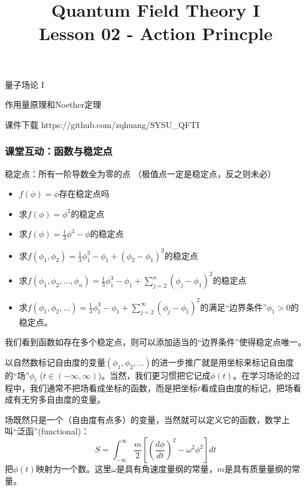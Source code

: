 \documentclass[CJK]{beamer}
\title{Quantum Field Theory I \\ Lesson 02 - Action Princple}
\author{}
\date{}
\begin{document}
\begin{frame}
 
\begin{center}
\begin{Large}
\bch
量子场论 I 

{\vskip 0.3in}

作用量原理和Noether定理

\ech
\end{Large}
\end{center}

\vskip 0.2in

\bch
课件下载
\ech
https://github.com/zqhuang/SYSU\_QFTI

\end{frame}


\begin{frame}
\frametitle{\bch 课堂互动：函数与稳定点 \ech}
\bch
稳定点：所有一阶导数全为零的点 （极值点一定是稳定点，反之则未必）
\begin{itemize}
\item{$f(\phi) = \phi$存在稳定点吗}
\item{求$f(\phi) = \phi^2$的稳定点}
\item{求$f(\phi) = \frac{1}{3}\phi^3-\phi$的稳定点}
\item{求$f(\phi_1, \phi_2) = \frac{1}{3}\phi_1^3 - \phi_1 + (\phi_2-\phi_1)^2$的稳定点}
\item{求$f(\phi_1, \phi_2, \ldots, \phi_n) = \frac{1}{3}\phi_1^3 - \phi_1 + \sum_{j=2}^n(\phi_j - \phi_1)^2$的稳定点}
\item{求$f(\phi_1, \phi_2, \ldots) = \frac{1}{3}\phi_1^3 - \phi_1 + \sum_{j=2}^\infty(\phi_j - \phi_1)^2$的满足“边界条件”$\phi_1>0$的稳定点。}
\end{itemize}

\skipline

我们看到函数如存在多个稳定点，则可以添加适当的“边界条件”使得稳定点唯一。

\ech
\end{frame}

\begin{frame}
\bch
以自然数标记自由度的变量$(\phi_1, \phi_2, \ldots)$的进一步推广就是用坐标来标记自由度的“场”$\phi_t$ ($t\in (-\infty, \infty)$)。当然，我们更习惯把它记成$\phi(t)$。在学习场论的过程中，我们通常不把场看成坐标的函数，而是把坐标$t$看成自由度的标记，把场看成有无穷多自由度的变量。

\skipline

场既然只是一个（自由度有点多）的变量，当然就可以定义它的函数，数学上叫“泛函”(functional)：
\ech
\bex
\bch
$$ S = \int_{-\infty}^\infty \frac{m}{2}\left[(\frac{d\phi}{dt})^2 - \omega^2\phi^2\right] dt$$
把$\phi(t)$映射为一个数。这里$\omega$是具有角速度量纲的常量，$m$是具有质量量纲的常量。
\ech
\eex
\end{frame}
\end{document}

